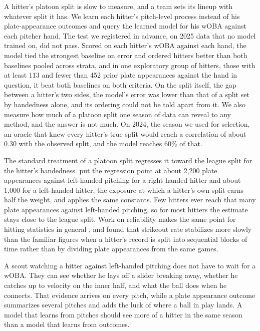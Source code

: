 \documentclass[11pt,letterpaper]{article}
\begin{document}
A hitter's platoon split is slow to measure, and a team sets its lineup with whatever split it has. We learn each hitter's pitch-level process instead of his plate-appearance outcomes and query the learned model for his wOBA against each pitcher hand. The test we registered in advance, on 2025 data that no model trained on, did not pass. Scored on each hitter's wOBA against each hand, the model tied the strongest baseline on error and ordered hitters better than both baselines pooled across strata, and in one exploratory group of hitters, those with at least 113 and fewer than 452 prior plate appearances against the hand in question, it beat both baselines on both criteria. On the split itself, the gap between a hitter's two sides, the model's error was lower than that of a split set by handedness alone, and its ordering could not be told apart from it. We also measure how much of a platoon split one season of data can reveal to any method, and the answer is not much. On 2024, the season we used for selection, an oracle that knew every hitter's true split would reach a correlation of about 0.30 with the observed split, and the model reaches 60\% of that.

The standard treatment of a platoon split regresses it toward the league split for the hitter's handedness. \citet{tango2007} put the regression point at about 2,200 plate appearances against left-handed pitching for a right-handed hitter and about 1,000 for a left-handed hitter, the exposure at which a hitter's own split earns half the weight, and \citet{klaassen2010} applies the same constants. Few hitters ever reach that many plate appearances against left-handed pitching, so for most hitters the estimate stays close to the league split. Work on reliability makes the same point for hitting statistics in general \citep{pemstein2016}, and \citet{carleton2017} found that strikeout rate stabilizes more slowly than the familiar figures when a hitter's record is split into sequential blocks of time rather than by dividing plate appearances from the same games.

A scout watching a hitter against left-handed pitching does not have to wait for a wOBA. They can see whether he lays off a slider breaking away, whether he catches up to velocity on the inner half, and what the ball does when he connects. That evidence arrives on every pitch, while a plate appearance outcome summarizes several pitches and adds the luck of where a ball in play lands. A model that learns from pitches should see more of a hitter in the same season than a model that learns from outcomes.
\end{document}
